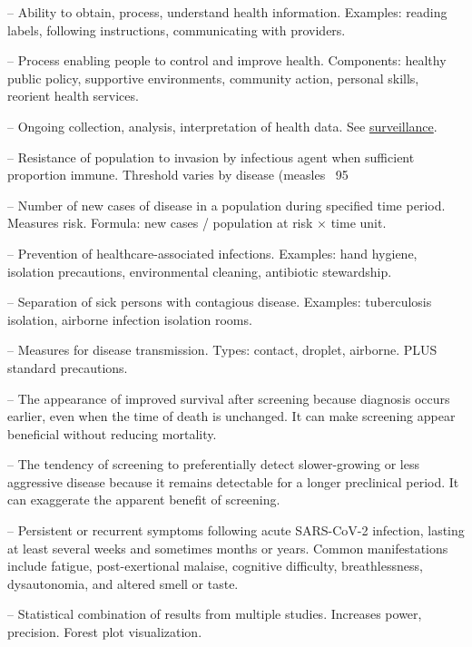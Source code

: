 -- Ability to obtain, process, understand health information. Examples: reading labels, following instructions, communicating with providers.

-- Process enabling people to control and improve health. Components: healthy public policy, supportive environments, community action, personal skills, reorient health services.


-- Ongoing collection, analysis, interpretation of health data. See \hyperlink{Surveillance}{surveillance}.


-- Resistance of population to invasion by infectious agent when sufficient proportion immune. Threshold varies by disease (measles ~95%


-- Number of new cases of disease in a population during specified time period. Measures risk. Formula: new cases / population at risk × time unit.

-- Prevention of healthcare-associated infections. Examples: hand hygiene, isolation precautions, environmental cleaning, antibiotic stewardship.

-- Separation of sick persons with contagious disease. Examples: tuberculosis isolation, airborne infection isolation rooms.


-- Measures for disease transmission. Types: contact, droplet, airborne. PLUS standard precautions.

-- The appearance of improved survival after screening because diagnosis occurs earlier, even when the time of death is unchanged. It can make screening appear beneficial without reducing mortality.


-- The tendency of screening to preferentially detect slower-growing or less aggressive disease because it remains detectable for a longer preclinical period. It can exaggerate the apparent benefit of screening.


-- Persistent or recurrent symptoms following acute SARS-CoV-2 infection, lasting at least several weeks and sometimes months or years. Common manifestations include fatigue, post-exertional malaise, cognitive difficulty, breathlessness, dysautonomia, and altered smell or taste.

-- Statistical combination of results from multiple studies. Increases power, precision. Forest plot visualization.

